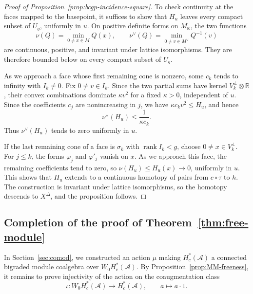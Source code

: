 \documentclass[12 pt]{amsart}
\newcommand{\RR}{\mathbb{R}}
\newcommand{\cA}{\mathcal{A}}
\newcommand{\rank}{\operatorname{rank}}
\newcommand{\<}{\langle}
\renewcommand{\>}{\rangle}
\theoremstyle{definition}
\begin{document}
\begin{proof}[Proof of Proposition~\ref{prop:bcgp-incidence-square}]
To check continuity at the faces mapped to the basepoint, it suffices to show that $H_u$ leaves every compact subset of $U_g$, uniformly in $u$. On positive definite forms on $M_\RR$, the two functions
\[
\nu(Q) = \min_{0 \neq x \in M} Q(x), \qquad \nu^\vee(Q) = \min_{0 \neq v \in M^\vee} Q^{-1}(v)
\]
are continuous, positive, and invariant under lattice isomorphisms. They are therefore bounded below on every compact subset of $U_g$.

As we approach a face whose first remaining cone is nonzero, some $c_k$ tends to infinity with $I_k \neq 0$. Fix $0 \neq v \in I_k$. Since the two partial sums have kernel $V_k^\perp \otimes \RR$, their convex combinations dominate $\kappa v^2$ for a fixed $\kappa > 0$, independent of $u$. Since the coefficients $c_j$ are nonincreasing in $j$, we have $\kappa c_k v^2 \leq H_u$, and hence
\[
\nu^\vee(H_u) \leq \frac{1}{\kappa c_k}.
\]
Thus $\nu^\vee(H_u)$ tends to zero uniformly in $u$.

If the last remaining cone of a face is $\sigma_k$ with $\rank I_k < g$, choose $0 \neq x \in V_k^\perp$. For $j \leq k$, the forms $\varphi_j$ and $\varphi'_j$ vanish on $x$. As we approach this face, the remaining coefficients tend to zero, so $\nu(H_u) \leq H_u(x) \to 0$, uniformly in $u$. This shows that $H_u$ extends to a continuous homotopy of pairs from $c \circ \tau$ to $h$. The construction is invariant under lattice isomorphisms, so the homotopy descends to $X^\Delta$, and the proposition follows.
\end{proof}

\subsection{Completion of the proof of Theorem~\ref{thm:free-module}}\label{sec:proof-of-freeness}

In Section~\ref{sec:comod}, we constructed an action $\mu$ making $H_c^*(\cA)$ a connected bigraded module coalgebra over $W_0 H_c^*(\cA)$. By Proposition~\ref{prop:MM-freeness}, it remains to prove injectivity of the action on the coaugmentation class
\[
\iota \colon W_0 H_c^*(\cA) \longrightarrow H_c^*(\cA), \qquad a \longmapsto a \cdot 1.
\]
\end{document}
